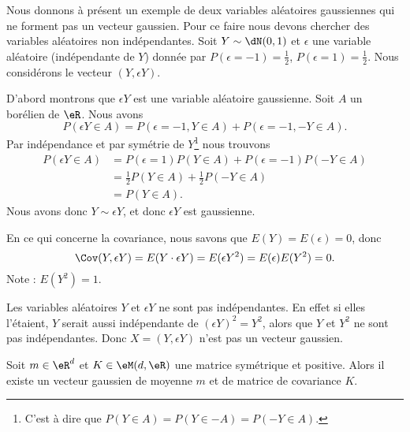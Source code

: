 \begin{example}
    Nous donnons à présent un exemple de deux variables aléatoires gaussiennes qui ne forment pas un vecteur gaussien. Pour ce faire nous devons chercher des variables aléatoires non indépendantes. Soit \( Y\sim \dN(0,1)\) et \( \epsilon\) une variable aléatoire (indépendante de \( Y\)) donnée par \( P(\epsilon=-1)=\frac{ 1 }{2}\), \( P(\epsilon=1)=\frac{ 1 }{2}\). Nous considérons le vecteur \( (Y,\epsilon Y)\).

    D'abord montrons que \( \epsilon Y\) est une variable aléatoire gaussienne. Soit \( A\) un borélien de \( \eR\). Nous avons
    \begin{equation}
        P(\epsilon Y\in A)=P(\epsilon=-1,Y\in A)+P(\epsilon=-1,-Y\in A).
    \end{equation}
    Par indépendance et par symétrie de \( Y\)\footnote{C'est à dire que \( P(Y\in A)=P(Y\in -A)=P(-Y\in A)\).} nous trouvons
    \begin{subequations}
        \begin{align}
            P(\epsilon Y\in A)&=P(\epsilon=1)P(Y\in A)+P(\epsilon=-1)P(-Y\in A)\\
            &=\frac{ 1 }{2}P(Y\in A)+\frac{ 1 }{2}P(-Y\in A)\\
            &=P(Y\in A).
        \end{align}
    \end{subequations}
    Nous avons donc \( Y\sim \epsilon Y\), et donc \( \epsilon Y\) est gaussienne.

    En ce qui concerne la covariance, nous savons que \( E(Y)=E(\epsilon)=0\), donc
    \begin{equation}
        \Cov(Y,\epsilon Y)=E(Y\cdot \epsilon Y)=E(\epsilon Y^2)=E(\epsilon)E(Y^2)=0.
    \end{equation}
    Note : \( E(Y^2)=1\).

    Les variables aléatoires \( Y\) et \( \epsilon Y\) ne sont pas indépendantes. En effet si elles l'étaient, \( Y\) serait aussi indépendante de \( (\epsilon Y)^2=Y^2\), alors que \( Y\) et \( Y^2\) ne sont pas indépendantes. Donc \( X=(Y,\epsilon Y)\) n'est pas un vecteur gaussien.
\end{example}

\begin{theorem}
    Soit \( m\in \eR^d\) et \( K\in \eM(d,\eR)\) une matrice symétrique et positive. Alors il existe un vecteur gaussien de moyenne \( m\) et de matrice de covariance \( K\).
\end{theorem}

